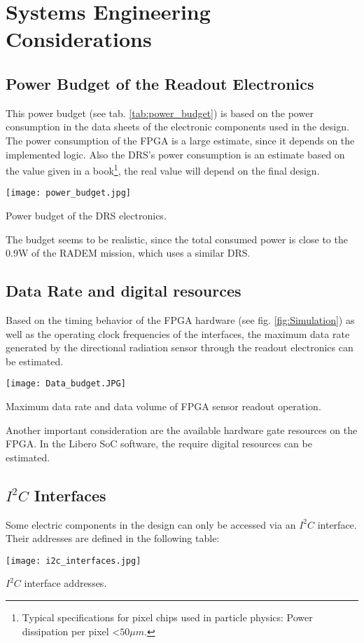 \section{Systems Engineering Considerations}
\label{sec:systems_engineering}

\subsection{Power Budget of the Readout Electronics}
\label{sec:power_budget}
This power budget (see tab. \ref{tab:power_budget}) is based on the power consumption in the data sheets of the electronic components used in the design.
The power consumption of the FPGA is a large estimate, since it depends on the implemented logic.
Also the DRS's power consumption is an estimate based on the value given in a book\footnote{Typical specifications for pixel chips used in particle physics: Power dissipation per pixel \textless $50\mu m$.\cite{rossi2006pixel}}, the real value will depend on the final design.
\begin{table}[H]
	\centering
    \texttt{[image: power\_budget.jpg]}
    \caption[Power Budget]{Power budget of the DRS electronics.}
	\label{tab:power_budget}
\end{table}

The budget seems to be realistic, since the total consumed power is close to the 0.9W\cite[p. 11, tab. 4]{tantalumproject2016} of the RADEM mission, which uses a similar DRS.

\subsection{Data Rate and digital resources}
Based on the timing behavior of the FPGA hardware (see fig. \ref{fig:Simulation}) as well as the operating clock frequencies of the interfaces, the maximum data rate generated by the directional radiation sensor through the readout electronics can be estimated. 

\begin{table}[H]
	\centering
    \texttt{[image: Data\_budget.JPG]}
    \caption[Power Budget]{Maximum data rate and data volume of FPGA sensor readout operation.}
	\label{tab:data_budget}
\end{table}

Another important consideration are the available hardware gate resources on the FPGA. In the Libero SoC software, the require digital resources can be estimated.


\subsection{\texorpdfstring{$I^2C$}{TEXT} Interfaces}
\label{sec:i2c_interfaces}
Some electric components in the design can only be accessed via an $I^2C$ interface. 
Their addresses are defined in the following table:
\begin{table}[H]
	\centering
    \texttt{[image: i2c\_interfaces.jpg]}
    \caption[$I^2C$ Interfaces]{$I^2C$ interface addresses.}
	\label{tab:i2c_interfaces}
\end{table}
